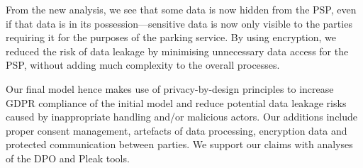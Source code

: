 From the new analysis, we see that some data is now hidden from the PSP, even if
that data is in its possession---sensitive data is now only visible to the
parties requiring it for the purposes of the parking service. By using
encryption, we reduced the risk of data leakage by minimising unnecessary data
access for the PSP, without adding much complexity to the overall processes.

Our final model hence makes use of privacy-by-design principles to increase
GDPR compliance of the initial model and reduce potential data leakage risks
caused by inappropriate handling and/or malicious actors. Our additions include
proper consent management, artefacts of data processing, encryption data and
protected communication between parties. We support our claims with analyses
of the DPO and Pleak tools.
